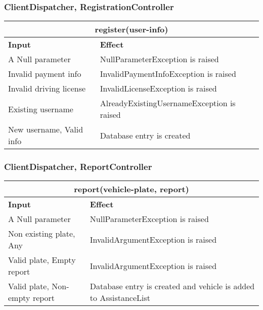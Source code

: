 \subsubsection{ClientDispatcher, RegistrationController}
\begin{tabular}{|p{5cm}|p{7cm}|}
\hline
\multicolumn{2}{|c|}{register(user-info)} \\
\hline
\textbf{Input} & \textbf{Effect} \\

\hline
A Null parameter & NullParameterException is raised \\

\hline
Invalid payment info & InvalidPaymentInfoException is raised \\

\hline
Invalid driving license & InvalidLicenseException is raised \\

\hline
Existing username & AlreadyExistingUsernameException is raised \\

\hline
New username, Valid info & Database entry is created \\
\hline
\end{tabular}
\subsubsection{ClientDispatcher, ReportController}

\begin{tabular}{|p{5cm}|p{7cm}|}
\hline
\multicolumn{2}{|c|}{report(vehicle-plate, report)} \\
\hline
\textbf{Input} & \textbf{Effect} \\

\hline
A Null parameter & NullParameterException is raised \\

\hline
Non existing plate, Any & InvalidArgumentException is raised \\

\hline
Valid plate, Empty report & InvalidArgumentException is raised \\

\hline
Valid plate, Non-empty report & Database entry is created and vehicle is added to AssistanceList\\
\hline
\end{tabular}